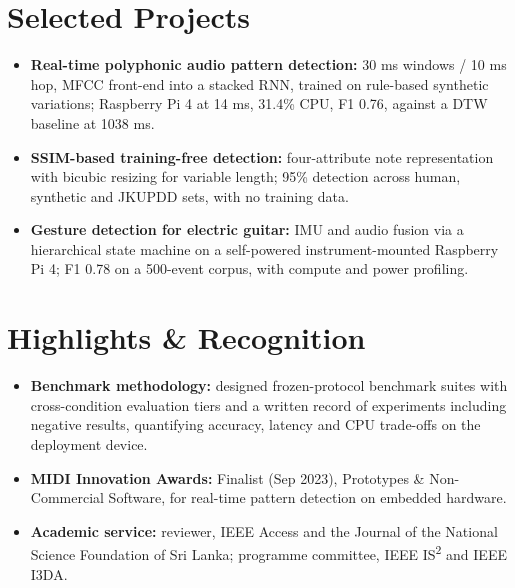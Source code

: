 \documentclass[11pt]{article}
\begin{document}
\section*{Selected Projects \footnotesize {}}
\begin{itemize}[leftmargin=1.2em, itemsep=-0.25em]
    \item \textbf{Real-time polyphonic audio pattern detection:} 30 ms windows / 10 ms hop, MFCC front-end into a stacked RNN, trained on rule-based synthetic variations; Raspberry Pi 4 at 14 ms, 31.4\% CPU, F1 0.76, against a DTW baseline at 1038 ms.
    \item \textbf{SSIM-based training-free detection:} four-attribute note representation with bicubic resizing for variable length; 95\% detection across human, synthetic and JKUPDD sets, with no training data.
    \item \textbf{Gesture detection for electric guitar:} IMU and audio fusion via a hierarchical state machine on a self-powered instrument-mounted Raspberry Pi 4; F1 0.78 on a 500-event corpus, with compute and power profiling.
\end{itemize}

\vspace{-0.5em}
\section*{Highlights \& Recognition}
\begin{itemize}[leftmargin=1.2em, itemsep=-0.25em]
    \item \textbf{Benchmark methodology:} designed frozen-protocol benchmark suites with cross-condition evaluation tiers and a written record of experiments including negative results, quantifying accuracy, latency and CPU trade-offs on the deployment device.
    \item \textbf{MIDI Innovation Awards:} Finalist (Sep 2023), Prototypes \& Non-Commercial Software, for real-time pattern detection on embedded hardware.
    \item \textbf{Academic service:} reviewer, IEEE Access and the Journal of the National Science Foundation of Sri Lanka; programme committee, IEEE IS\textsuperscript{2} and IEEE I3DA.
\end{itemize}
\end{document}
